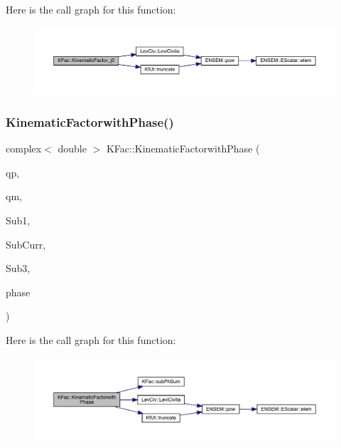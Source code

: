 Here is the call graph for this function\+:
\nopagebreak
\begin{figure}[H]
\begin{center}
\leavevmode
\includegraphics[width=350pt]{d2/d89/namespaceKFac_a6f8f443ade2532c958e4dc168d7da1c7_cgraph}
\end{center}
\end{figure}
\mbox{\label{namespaceKFac_a5fe5ea6a5ab8c5c87ca764f254396434}} 
\subsubsection{\texorpdfstring{KinematicFactorwithPhase()}{KinematicFactorwithPhase()}\hspace{0.1cm}{\footnotesize\ttfamily [1/2]}}
{\footnotesize\ttfamily complex$<$ double $>$ K\+Fac\+::\+Kinematic\+Factorwith\+Phase (\begin{DoxyParamCaption}\item[{Eigen\+::\+Vector\+Xd \&}]{qp,  }\item[{Eigen\+::\+Vector\+Xd \&}]{qm,  }\item[{map$<$ int, Eigen\+::\+Matrix\+Xcd $>$ \&}]{Sub1,  }\item[{Eigen\+::\+Matrix\+Xcd \&}]{Sub\+Curr,  }\item[{map$<$ int, Eigen\+::\+Matrix\+Xcd $>$ \&}]{Sub3,  }\item[{\mbox{\hyperlink{structPh_1_1phChars}{Ph\+::ph\+Chars}} \&}]{phase }\end{DoxyParamCaption})}

Here is the call graph for this function\+:
\nopagebreak
\begin{figure}[H]
\begin{center}
\leavevmode
\includegraphics[width=350pt]{d2/d89/namespaceKFac_a5fe5ea6a5ab8c5c87ca764f254396434_cgraph}
\end{center}
\end{figure}
\mbox{\label{namespaceKFac_ac10b1bd8db1661c292e327a3eabcebb9}} 
